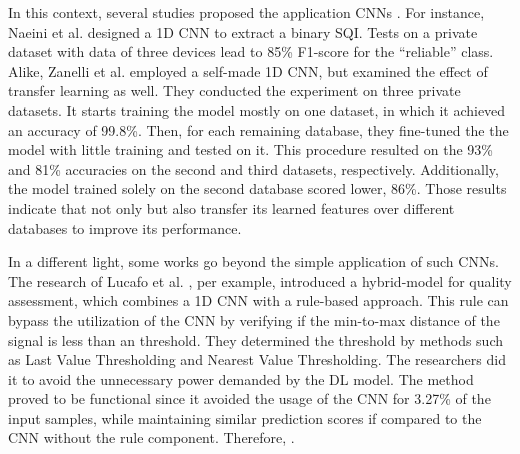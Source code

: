 In this context, several studies proposed the application \glspl{CNN} . For instance, Naeini et al. \cite{deep-learning-1} designed a 1D \gls{CNN} to extract a binary \gls{SQI}. Tests on a private dataset with data of three devices lead to 85\% F1-score for the ``reliable'' class. Alike, Zanelli et al. \cite{deep-learning-2} employed a self-made 1D \gls{CNN}, but examined the effect of transfer learning as well. They conducted the experiment on three private datasets. It starts training the model mostly on one dataset, in which it achieved an accuracy of 99.8\%. Then, for each remaining database, they fine-tuned the the model with little training and tested on it. This procedure resulted on the 93\% and 81\% accuracies on the second and third datasets, respectively. Additionally, the model trained solely on the second database scored lower, 86\%. Those results indicate that not only  but also  transfer its learned features over different databases to improve its performance.

In a different light, some works go beyond the simple application of such \glspl{CNN}. The research of Lucafo et al. \cite{deep-learning-3}, per example, introduced a hybrid-model for quality assessment, which combines a 1D \gls{CNN} with a rule-based approach. This rule can bypass the utilization of the \gls{CNN} by verifying if the min-to-max distance of the signal is less than an threshold. They determined the threshold by methods such as Last Value Thresholding and Nearest Value Thresholding. The researchers did it to avoid the unnecessary power demanded by the \gls{DL} model. The method proved to be functional since it avoided the usage of the \gls{CNN} for 3.27\% of the input samples, while maintaining similar prediction scores if compared to the \gls{CNN} without the rule component. Therefore, .  

